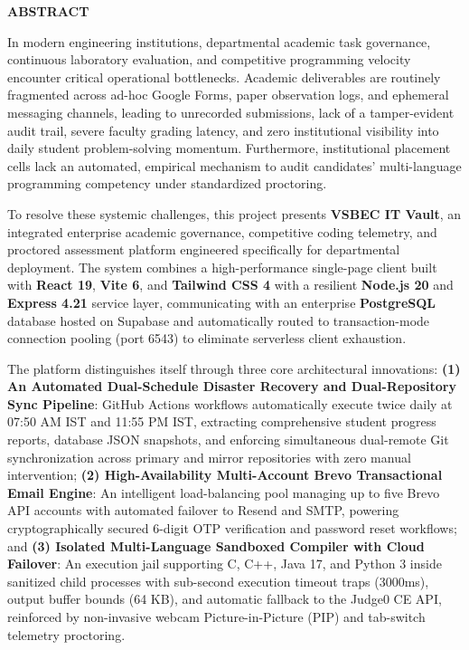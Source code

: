 \clearpage
{}
\setcounter{page}{8}
\pagestyle{fancy}
\fancyhf{}
\renewcommand{\headrulewidth}{0pt}
\cfoot{\fontsize{12pt}{14pt}\selectfont\thepage}

\begin{center}
  {\fontsize{16pt}{20pt}\selectfont\bfseries ABSTRACT\par}
\end{center}
\vspace{0.3cm}

{\fontsize{12pt}{17.2pt}\selectfont
In modern engineering institutions, departmental academic task governance, continuous laboratory evaluation, and competitive programming velocity encounter critical operational bottlenecks. Academic deliverables are routinely fragmented across ad-hoc Google Forms, paper observation logs, and ephemeral messaging channels, leading to unrecorded submissions, lack of a tamper-evident audit trail, severe faculty grading latency, and zero institutional visibility into daily student problem-solving momentum. Furthermore, institutional placement cells lack an automated, empirical mechanism to audit candidates' multi-language programming competency under standardized proctoring.

To resolve these systemic challenges, this project presents \textbf{VSBEC IT Vault}, an integrated enterprise academic governance, competitive coding telemetry, and proctored assessment platform engineered specifically for departmental deployment. The system combines a high-performance single-page client built with \textbf{React 19}, \textbf{Vite 6}, and \textbf{Tailwind CSS 4} with a resilient \textbf{Node.js 20} and \textbf{Express 4.21} service layer, communicating with an enterprise \textbf{PostgreSQL} database hosted on Supabase and automatically routed to transaction-mode connection pooling (port 6543) to eliminate serverless client exhaustion.

The platform distinguishes itself through three core architectural innovations: \textbf{(1) An Automated Dual-Schedule Disaster Recovery and Dual-Repository Sync Pipeline}: GitHub Actions workflows automatically execute twice daily at 07:50 AM IST and 11:55 PM IST, extracting comprehensive student progress reports, database JSON snapshots, and enforcing simultaneous dual-remote Git synchronization across primary and mirror repositories with zero manual intervention; \textbf{(2) High-Availability Multi-Account Brevo Transactional Email Engine}: An intelligent load-balancing pool managing up to five Brevo API accounts with automated failover to Resend and SMTP, powering cryptographically secured 6-digit OTP verification and password reset workflows; and \textbf{(3) Isolated Multi-Language Sandboxed Compiler with Cloud Failover}: An execution jail supporting C, C++, Java 17, and Python 3 inside sanitized child processes with sub-second execution timeout traps (3000ms), output buffer bounds (64 KB), and automatic fallback to the Judge0 CE API, reinforced by non-invasive webcam Picture-in-Picture (PIP) and tab-switch telemetry proctoring.

}
